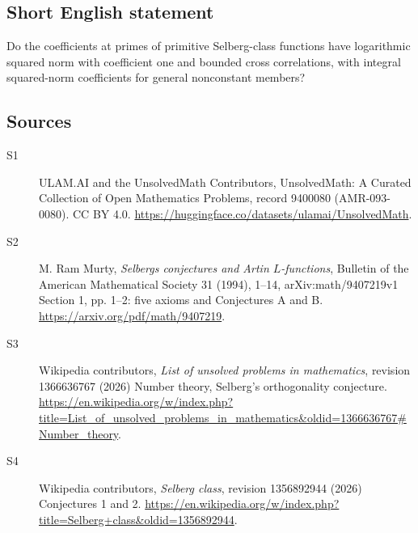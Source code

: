\documentclass[11pt]{article}
\begin{document}
\subsection{Short English statement}
Do the coefficients at primes of primitive Selberg-class functions have logarithmic squared norm with coefficient one and bounded cross correlations, with integral squared-norm coefficients for general nonconstant members?
\subsection{Sources}
\begin{description}
\item[\hypertarget{source:9400080:1}{S1}] ULAM.AI and the UnsolvedMath Contributors, UnsolvedMath: A Curated Collection of Open Mathematics Problems, record 9400080 (AMR-093-0080). CC BY 4.0. \url{https://huggingface.co/datasets/ulamai/UnsolvedMath}.
\item[\hypertarget{source:9400080:2}{S2}] M. Ram Murty, \emph{Selberg\textquotesingle s conjectures and Artin $L$-functions}, Bulletin of the American Mathematical Society 31 (1994), 1--14, arXiv:math/9407219v1 Section 1, pp. 1--2: five axioms and Conjectures A and B. \url{https://arxiv.org/pdf/math/9407219}.
\item[\hypertarget{source:9400080:3}{S3}] Wikipedia contributors, \emph{List of unsolved problems in mathematics}, revision 1366636767 (2026) Number theory, Selberg's orthogonality conjecture. \url{https://en.wikipedia.org/w/index.php?title=List_of_unsolved_problems_in_mathematics&oldid=1366636767#Number_theory}.
\item[\hypertarget{source:9400080:4}{S4}] Wikipedia contributors, \emph{Selberg class}, revision 1356892944 (2026) Conjectures 1 and 2. \url{https://en.wikipedia.org/w/index.php?title=Selberg+class&oldid=1356892944}.
\end{description}
\label{end:9400080}
\end{document}
